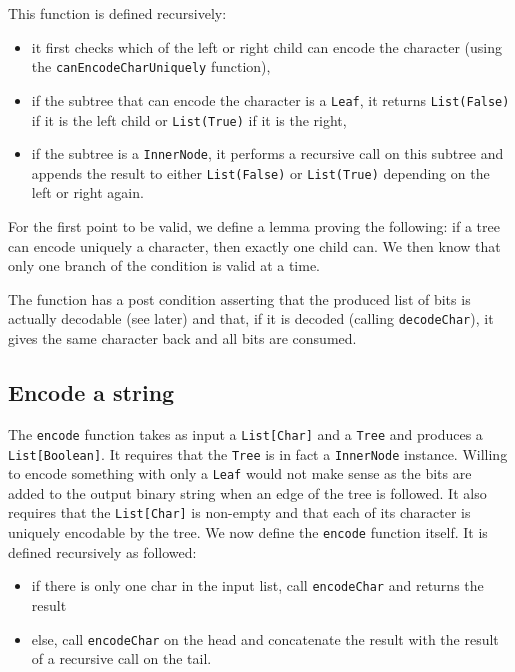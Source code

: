 \documentclass[a4paper,UKenglish,cleveref, autoref, thm-restate]{lipics-v2021}
\begin{document}
This function is defined recursively:
\begin{itemize}
    \item it first checks which of the left or right child can encode the character (using the \lstinline{canEncodeCharUniquely} function),
    \item if the subtree that can encode the character is a \lstinline{Leaf}, it returns \lstinline{List(False)} if it is the left child or \lstinline{List(True)} if it is the right,
    \item if the subtree is a \lstinline{InnerNode}, it performs a recursive call on this subtree and appends the result to either \lstinline{List(False)} or \lstinline{List(True)} depending on the left or right again.
\end{itemize}

For the first point to be valid, we define a lemma proving the following: if a tree can encode uniquely a character, then exactly one child can. We then know that only one branch of the condition is valid at a time.

The function has a post condition asserting that the produced list of bits is actually decodable (see later) and that, if it is decoded (calling \lstinline{decodeChar}), it gives the same character back and all bits are consumed.

\subsection{Encode a string}
The \lstinline{encode} function takes as input a \lstinline{List[Char]} and a \lstinline{Tree} and produces a \lstinline{List[Boolean]}.
It requires that the \lstinline{Tree} is in fact a \lstinline{InnerNode} instance. Willing to encode something with only a \lstinline{Leaf} would not make sense as the bits are added to the output binary string when an edge of the tree is followed.
It also requires that the \lstinline{List[Char]} is non-empty and that each of its character is uniquely encodable by the tree.
We now define the \lstinline{encode} function itself. It is defined recursively as followed:
\begin{itemize}
    \item if there is only one char in the input list, call \lstinline{encodeChar} and returns the result
    \item else, call \lstinline{encodeChar} on the head and concatenate the result with the result of a recursive call on the tail.
\end{itemize}
\end{document}
